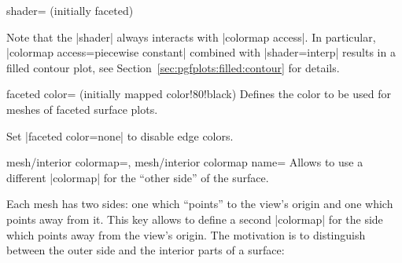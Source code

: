 {\begin{pgfplotskey}{shader= (initially faceted)%
}
\pgfplotsexpensiveexample
\begin{codeexample}[]
\end{codeexample}

    Note that the |shader| always interacts with |colormap access|. In
    particular, |colormap access=piecewise constant| combined with
    |shader=interp| results in a filled contour plot, see
    Section~\ref{sec:pgfplots:filled:contour} for details.
\end{pgfplotskey}

\begin{pgfplotskey}{faceted color= (initially mapped color!80!black)}
    Defines the color to be used for meshes of faceted surface plots.

    Set |faceted color=none| to disable edge colors.
\end{pgfplotskey}

{
%
\begin{pgfplotskeylist}{%
    mesh/interior colormap=,%
    mesh/interior colormap name=%
}
    Allows to use a different |colormap| for the ``other side'' of the surface.

    Each mesh has two sides: one which ``points'' to the view's origin and one
    which points away from it. This key allows to define a second |colormap|
    for the side which points away from the view's origin. The motivation is to
    distinguish between the outer side and the interior parts of a surface:
\pgfplotsexpensiveexample
\begin{codeexample}[]
\end{codeexample}


\end{pgfplotskeylist}}}
